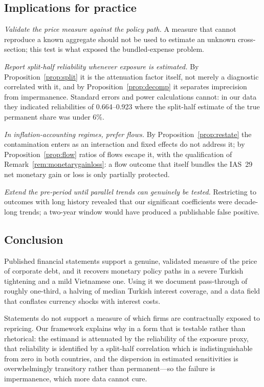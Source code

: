 \documentclass[review,12pt,authoryear]{elsarticle}
\theoremstyle{plain}
\theoremstyle{definition}
\begin{document}
\subsection{Implications for practice}
\label{sec:implications}


\emph{Validate the price measure against the policy path.} A measure that cannot
reproduce a known aggregate should not be used to estimate an unknown
cross-section; this test is what exposed the bundled-expense problem.

\emph{Report split-half reliability whenever exposure is estimated.} By
Proposition~\ref{prop:split} it is the attenuation factor itself, not merely a
diagnostic correlated with it, and by Proposition~\ref{prop:decomp} it separates
imprecision from impermanence. Standard errors and power calculations cannot:
in our data they indicated reliabilities of 0.664--0.923 where the split-half
estimate of the true permanent share was under 6\%.

\emph{In inflation-accounting regimes, prefer flows.} By
Proposition~\ref{prop:restate} the contamination enters as an interaction and
fixed effects do not address it; by Proposition~\ref{prop:flow} ratios of flows
escape it, with the qualification of Remark~\ref{rem:monetarygainloss}: a flow
outcome that itself bundles the IAS~29 net monetary gain or loss is only
partially protected.

\emph{Extend the pre-period until parallel trends can genuinely be tested.}
Restricting to outcomes with long history revealed that our significant
coefficients were decade-long trends; a two-year window would have produced a
publishable false positive.

\subsection{Conclusion}
\label{sec:concl}


Published financial statements support a genuine, validated measure of the price
of corporate debt, and it recovers monetary policy paths in a severe Turkish
tightening and a mild Vietnamese one. Using it we document pass-through of
roughly one-third, a halving of median Turkish interest coverage, and a data field
that conflates currency shocks with interest costs.

Statements do not support a measure of which firms are contractually exposed to
repricing. Our framework explains why in a form that is testable rather than
rhetorical: the estimand is attenuated by the reliability of the exposure
proxy, that reliability is identified by a split-half correlation which is
indistinguishable from zero in both countries, and the dispersion in estimated
sensitivities is overwhelmingly transitory rather than permanent---so the
failure is impermanence, which more data cannot cure.
\end{document}
